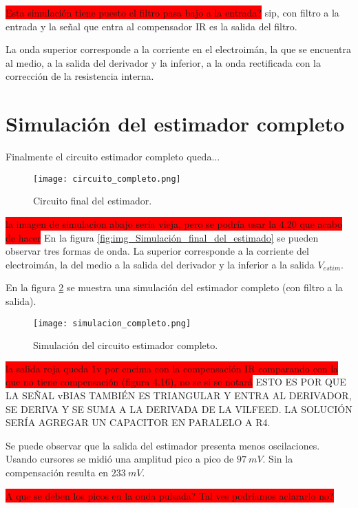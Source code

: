 \colorbox{red}{Esta simulación tiene puesto el filtro pasa bajo a la entrada?} sip, con filtro a la entrada y la señal que entra al compensador IR es la salida del filtro.

La onda superior corresponde a la corriente en el electroimán, la que se encuentra al medio, a la salida del derivador y la inferior, a la onda rectificada con la corrección de la resistencia interna.

\section{Simulación del estimador completo}

Finalmente el circuito estimador completo queda...

\begin{figure}[H]
\centering
\texttt{[image: circuito\_completo.png]}
\caption{Circuito final del estimador.}
\label{fig:img_circuito_final_del_estimador}
\end{figure}


\colorbox{red}{la imagen de simulacion abajo sería vieja, pero se podría usar la 4.20 que acabo de hacer}
En la figura \ref{fig:img_Simulación_final_del_estimado} se pueden observar tres formas de onda. La superior corresponde a la corriente del electroimán, la del medio a la salida del derivador y la inferior a la salida $V_{estim}$.

En la figura \ref{fig:img_simulacion_completo} se muestra una simulación del estimador completo (con filtro a la salida).

\begin{figure}[H]
	\centering
	\texttt{[image: simulacion\_completo.png]}
	\caption{Simulación del circuito estimador completo.}
	\label{fig:img_simulacion_completo}
\end{figure}
\colorbox{red}{la salida roja queda 1v por encima con la compensación IR comparando con la que no tiene compensación (figura 4.16), no se si se notará}
ESTO ES POR QUE LA SEÑAL vBIAS TAMBIÉN ES TRIANGULAR Y ENTRA AL DERIVADOR, SE DERIVA Y SE SUMA A LA DERIVADA DE LA VILFEED. LA SOLUCIÓN SERÍA AGREGAR UN CAPACITOR EN PARALELO A R4.

Se puede observar que la salida del estimador presenta menos oscilaciones. Usando cursores se midió una amplitud pico a pico de $97\:mV$. Sin la compensación resulta en $233\:mV$.

\colorbox{red}{A que se deben los picos en la onda pulsada? Tal ves podríamos aclararlo no?}


